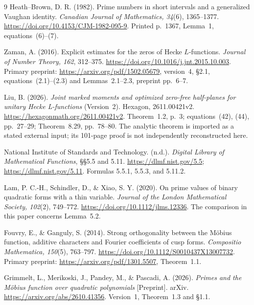 \documentclass[11pt]{article}
\numberwithin{equation}{section}
\begin{document}
\begin{thebibliography}{9}
Heath--Brown, D. R. (1982).
Prime numbers in short intervals and a generalized Vaughan identity.
\emph{Canadian Journal of Mathematics, 34}(6), 1365--1377.
\url{https://doi.org/10.4153/CJM-1982-095-9}.
Printed p.~1367, Lemma~1, equations~(6)--(7).

Zaman, A. (2016).
Explicit estimates for the zeros of Hecke \(L\)-functions.
\emph{Journal of Number Theory, 162}, 312--375.
\url{https://doi.org/10.1016/j.jnt.2015.10.003}.
Primary preprint: \url{https://arxiv.org/pdf/1502.05679},
version~4, \S2.1, equations~(2.1)--(2.3) and
Lemmas~2.1--2.3, preprint pp.~6--7.

Liu, B. (2026).
\emph{Joint marked moments and optimized zero-free half-planes for
unitary Hecke L-functions} (Version~2). Hexagon, 2611.00421v2.
\url{https://hexagonmath.org/2611.00421v2}.
Theorem~1.2, p.~3; equations~(42), (44), pp.~27--29;
Theorem~8.29, pp.~78--80. The analytic theorem is imported as a
stated external input; its 101-page proof is not independently
reconstructed here.

National Institute of Standards and Technology. (n.d.).
\emph{Digital Library of Mathematical Functions},
\S\S5.5 and 5.11.
\url{https://dlmf.nist.gov/5.5};
\url{https://dlmf.nist.gov/5.11}.
Formulas 5.5.1, 5.5.3, and 5.11.2.

Lam, P. C.-H., Schindler, D., \& Xiao, S. Y. (2020).
On prime values of binary quadratic forms with a thin variable.
\emph{Journal of the London Mathematical Society, 102}(2), 749--772.
\url{https://doi.org/10.1112/jlms.12336}.
The comparison in this paper concerns Lemma~5.2.

Fouvry, E., \& Ganguly, S. (2014).
Strong orthogonality between the M\"obius function, additive
characters and Fourier coefficients of cusp forms.
\emph{Compositio Mathematica, 150}(5), 763--797.
\url{https://doi.org/10.1112/S0010437X13007732}.
Primary preprint: \url{https://arxiv.org/pdf/1301.5507}, Theorem~1.1.

Grimmelt, L., Merikoski, J., Pandey, M., \& Pascadi, A. (2026).
\emph{Primes and the M\"obius function over quadratic polynomials}
[Preprint]. arXiv.
\url{https://arxiv.org/abs/2610.41356}.
Version~1, Theorem~1.3 and \S1.1.
\end{thebibliography}
\end{document}
